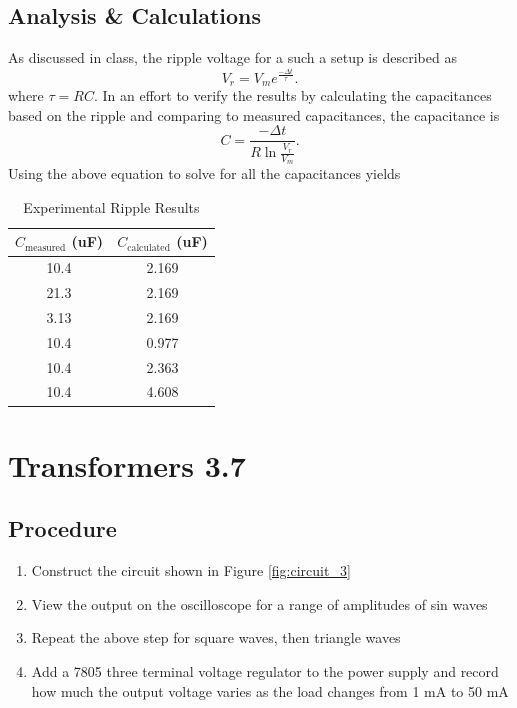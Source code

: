 \documentclass[12pt,letterpaper]{report}
\begin{document}

\subsection*{Analysis \& Calculations}
As discussed in class, the ripple voltage for a such a setup is described as
$$
V_r = V_me^{\frac{-\Delta t}{\tau}}.
$$
where $ \tau = RC $. In an effort to verify the results by calculating the capacitances based on the ripple and comparing to measured capacitances, the capacitance is
$$
C = \frac{- \Delta t}{R\ln \frac{V_r}{V_m}}.
$$
Using the above equation to solve for all the capacitances yields

\begin{table}[ht]
\caption{Experimental Ripple Results} %
\centering 
    \begin{tabular}{| c | c |}
    \hline  
    $C_{\text{measured}}$ (uF) & $C_{\text{calculated}}$ (uF)\\
    \hline
    10.4 & 2.169 \\
    21.3 & 2.169 \\
    3.13 & 2.169 \\
    10.4 & 0.977 \\
    10.4 & 2.363 \\
    10.4 & 4.608 \\
    \hline
    \end{tabular}
    \label{table:c_comparisons}
\end{table}

\section*{Transformers 3.7}
\subsection*{Procedure}

\begin{enumerate}
\item Construct the circuit shown in Figure \ref{fig:circuit_3}
\item View the output on the oscilloscope for a range of amplitudes of sin waves
\item Repeat the above step for square waves, then triangle waves
\item Add a 7805 three terminal voltage regulator to the power supply and record how much the  output voltage varies as the load changes from 1 mA to 50 mA
\end{enumerate}
\end{document}
